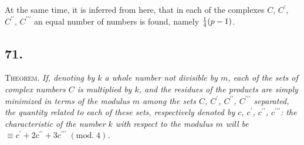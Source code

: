\documentclass[twoside,12pt, showframe]{memoir}
\renewcommand{\pmod}[1]{\;(\textrm{mod.}\;#1)}
\let\oldfrac\frac
\def\frac#1#2{\mathchoice{\tfrac{#1}{#2}}{\oldfrac{#1}{#2}}{\genfrac{}{}{}{2}{#1}{#2\mathstrut}}{\genfrac{}{}{}{3}{#1}{#2\mathstrut}}}
\begin{document}
At the same time, it is inferred from here, that in each of the complexes \(C\), \(C^{\prime}\), \(C^{\prime \prime}\), \(C^{\prime \prime \prime}\) an equal number of numbers is found, namely \(\frac{1}{4}(p-1)\).
%

\subsection*{71.}
 
\textsc{Theorem.} \textit{If, denoting by \(k\) a whole number not divisible by \(m\), each of the sets of complex numbers \(C\) is multiplied by \(k\), and the residues of the products are simply minimized in terms of the modulus \(m\) among the sets \(C\), \( C^{\prime}\), \( C^{\prime \prime}\), \( C^{\prime \prime \prime}\) separated, the quantity related to each of these sets, respectively denoted by \(c\), \( c^{\prime}\), \( c^{\prime \prime}\), \( c^{\prime \prime \prime}\): the characteristic of the number \(k\) with respect to the modulus \(m\) will be \(\equiv c^{\prime}+2 c^{\prime \prime}+3 c^{\prime \prime \prime}\pmod{4}\).}
%
\end{document}
